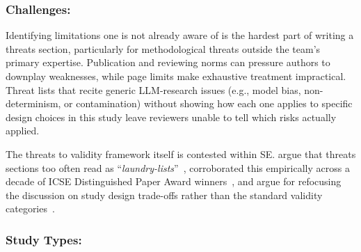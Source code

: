 \documentclass[smallextended]{svjour3}
\newcommand*{\enq}[1]{\enquote{{\itshape#1}}}
\newcommand{\guidelinesubsubsection}[1]{\subsubsection{\bfseries #1:}}
\newcommand{\guidelinesubsubsection}[1]{\subsubsection{#1}}
\begin{document}
\guidelinesubsubsection{Challenges}

Identifying limitations one is not already aware of is the hardest part of writing a threats section, particularly for methodological threats outside the team's primary expertise. Publication and reviewing norms can pressure authors to downplay weaknesses, while page limits make exhaustive treatment impractical. Threat lists that recite generic LLM-research issues (e.g., model bias, non-determinism, or contamination) without showing how each one applies to specific design choices in this study leave reviewers unable to tell which risks actually applied.

The threats to validity framework itself is contested within SE. \citeauthor{DBLP:journals/infsof/VerdecchiaELRS23} argue that threats sections too often read as \enq{laundry-lists}~\cite{DBLP:journals/infsof/VerdecchiaELRS23}, \citeauthor{DBLP:conf/esem/LagoRSV24} corroborated this empirically across a decade of ICSE Distinguished Paper Award winners~\cite{DBLP:conf/esem/LagoRSV24}, and \citeauthor{DBLP:journals/tosem/RobillardAEGLNNSSS24} argue for refocusing the discussion on study design trade-offs rather than the standard validity categories~\cite{DBLP:journals/tosem/RobillardAEGLNNSSS24}.

\guidelinesubsubsection{Study Types}
\end{document}

